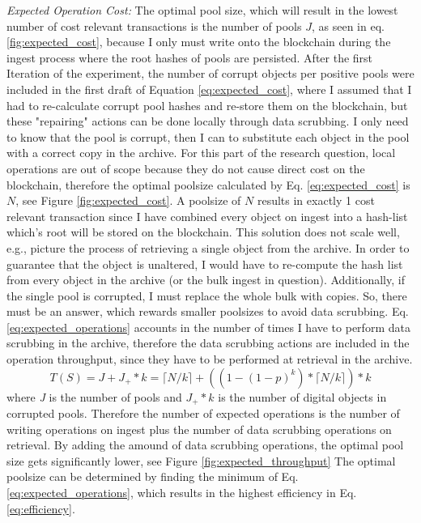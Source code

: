 \textit{Expected Operation Cost:} The optimal pool size, which will result in the lowest number of cost relevant transactions is the number of pools $J$, as seen in eq. \ref{fig:expected_cost}, because I only must write onto the blockchain during the ingest process where the root hashes of pools are persisted.
After the first Iteration of the experiment, the number of corrupt objects per positive pools were included in the first draft of Equation \ref{eq:expected_cost}, where I assumed that I had to re-calculate corrupt pool hashes and re-store them on the blockchain, but these "repairing" actions can be done locally through data scrubbing. I only need to know that the pool is corrupt, then I can to substitute each object in the pool with a correct copy in the archive. For this part of the research question, local operations are out of scope because they do not cause direct cost on the blockchain, therefore the optimal poolsize calculated by Eq. \ref{eq:expected_cost} is $N$, see Figure \ref{fig:expected_cost}. A poolsize of $N$ results in exactly 1 cost relevant transaction since I have combined every object on ingest into a hash-list which's root will be stored on the blockchain. This solution does not scale well, e.g., picture the process of retrieving a single object from the archive. In order to guarantee that the object is unaltered, I would have to re-compute the hash list from every object in the archive (or the bulk ingest in question). Additionally, if the single pool is corrupted, I must replace the whole bulk with copies. 
So, there must be an answer, which rewards smaller poolsizes to avoid data scrubbing. Eq. \ref{eq:expected_operations} accounts in the number of times I have to perform data scrubbing in the archive, therefore the data scrubbing actions are included in the operation throughput, since they have to be performed at retrieval in the archive.
\begin{equation}\label{eq:expected_operations}
    T(S) = J + J_+ * k = \lceil N/k \rceil + ((1-(1-p)^k)* \lceil N/k \rceil) * k
\end{equation}
where \textit{J} is the number of pools and \textit{$J_+ * k$} is the number of digital objects in corrupted pools. Therefore the number of expected operations is the number of writing operations on ingest plus the number of data scrubbing operations on retrieval. By adding the amound of data scrubbing operations, the optimal pool size gets significantly lower, see Figure \ref{fig:expected_throughput} The optimal poolsize  can be determined by finding the minimum of Eq. \ref{eq:expected_operations}, which results in the highest efficiency in Eq. \ref{eq:efficiency}.
